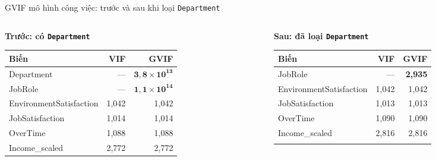 \documentclass[10pt,aspectratio=169]{beamer}
\begin{document}
\begin{frame}{GVIF mô hình công việc: trước và sau khi loại \texttt{Department}}
  \begin{columns}[T,onlytextwidth]
    \begin{column}{0.49\textwidth}
      \centering\small
      \textbf{\color{HCMUSRed}Trước: có \texttt{Department}}\\[0.12cm]
      \scriptsize
      \renewcommand{\arraystretch}{1.22}
      \begin{tabular}{lrr}
        \toprule
        Biến & VIF & GVIF\\
        \midrule
        \rowcolor{HCMUSLight}
        Department & --- & $\mathbf{3{,}8{\times}10^{13}}$\\
        \rowcolor{HCMUSLight}
        JobRole & --- & $\mathbf{1{,}1{\times}10^{14}}$\\
        EnvironmentSatisfaction & 1,042 & 1,042\\
        JobSatisfaction & 1,014 & 1,014\\
        OverTime & 1,088 & 1,088\\
        Income\_scaled & 2,772 & 2,772\\
        \bottomrule
      \end{tabular}
    \end{column}
    \begin{column}{0.49\textwidth}
      \centering\small
      \textbf{\color{HCMUSGreen}Sau: đã loại \texttt{Department}}\\[0.12cm]
      \scriptsize
      \renewcommand{\arraystretch}{1.22}
      \begin{tabular}{lrr}
        \toprule
        Biến & VIF & GVIF\\
        \midrule
        JobRole & --- & \textbf{2,935}\\
        EnvironmentSatisfaction & 1,042 & 1,042\\
        JobSatisfaction & 1,013 & 1,013\\
        OverTime & 1,090 & 1,090\\
        Income\_scaled & 2,816 & 2,816\\
        & & \\
        \bottomrule
      \end{tabular}
    \end{column}
  \end{columns}

\end{frame}
\end{document}
